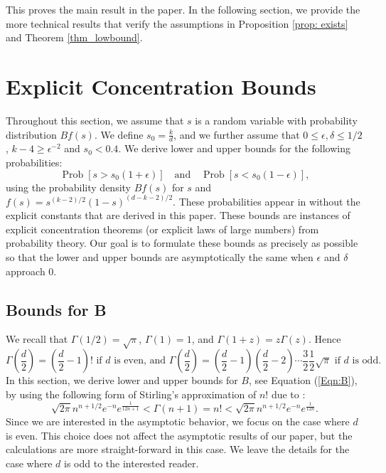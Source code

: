 \documentclass[twoside,11pt]{article}
\newcommand{\pP}[1]{\operatorname{Prob}\left[ #1 \right] }
\begin{document}
This proves the main result in the paper.  In the following section, we provide the more technical results that verify the assumptions in Proposition \ref{prop: exists} and Theorem \ref{thm_lowbound}.

\section{Explicit Concentration Bounds}\label{Concentration}

Throughout  this section,  we assume that  $s$ is a random variable with probability distribution $Bf(s)$.  We define $s_0=\frac{k}{d}$, and we further assume that $0\leq \epsilon,\delta\leq 1/2$, $k-4\geq\epsilon^{-2}$ and $s_0<0.4$.  We derive lower and upper  bounds for the following probabilities:
\[  \pP{s>s_0(1+\epsilon)}\quad\text{and}\quad \pP{s<s_0(1-\epsilon)},\]
using the probability density $Bf(s)$ for $s$ and $f(s)=s^{(k-2)/2}(1-s)^{(d-k-2)/2}$.
These probabilities appear in \cite[Theorem 20]{KaneNelsonMeka} without the explicit constants that are derived in this paper.  These bounds are instances of explicit  concentration theorems (or explicit  laws of large numbers) from probability theory.
Our goal is to formulate these bounds as precisely as possible so that the lower and upper bounds are asymptotically the same
when $\epsilon$ and $\delta$ approach $0$.
			
\subsection{Bounds for B} 

We recall that $\Gamma(1/2) = \sqrt{\pi}$, $\Gamma(1) = 1$, and $\Gamma(1+z) = z\Gamma(z)$.  Hence 
\[ \Gamma\left(\frac{d}{2}\right) =  \left(\frac{d}{2} -1\right)!  \mbox{  if $d$ is even, and } \Gamma\left(\frac{d}{2}\right) =  \left(\frac{d}{2} -1\right) \left(\frac{d}{2} -2\right) \cdots \frac{3}{2} \frac{1}{2}  \sqrt{\pi}  \mbox{  if $d$ is odd}.\]
In this section, we derive lower and upper bounds for $B$, see Equation (\ref{Eqn:B}), by  using  the following form of Stirling's approximation of $n!$ due to \cite{Robbins}: 
					\[\sqrt{2\pi}n^{n+1/2}e^{-n}e^{\frac{1}{12n+1}} <  \Gamma(n+1) = n! < \sqrt{2\pi} n^{n+1/2}e^{-n}e^{\frac{1}{12n}}.\]
Since we are interested in the asymptotic behavior, we focus on the case where $d$ is even.  This choice does not affect the asymptotic results of our paper, but the calculations are more straight-forward in this case.  We leave the details for the case where $d$ is odd to the interested reader.
\end{document}
